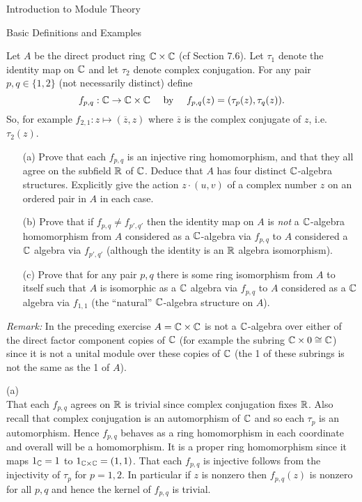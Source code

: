 \begin{chapter}{Introduction to Module Theory}
\begin{section}{Basic Definitions and Examples}
\begin{solution}
\end{solution}\oneperpage



\begin{problem}\label{ex:10.1.23}
Let $A$ be the direct product ring $\mathbb{C}\times \mathbb{C}$ (cf Section 7.6). Let $\tau_1$ denote the identity map on $\mathbb{C}$ and let $\tau_2$ denote complex conjugation. For any pair $p,q\in \{1,2\}$ (not necessarily distinct) define \[
f_{p,q}:\mathbb{C}\to\mathbb{C}\times \mathbb{C}\quad\text{ by }\quad f_{p,q}(z) = (\tau_p(z),\tau_q(z)).
\]
So, for example $f_{2,1}: z\mapsto (\overline{z},z)$ where $\overline{z}$ is the complex conjugate of $z$, i.e. $\tau_2(z)$.\begin{enumerate}
\item[(a)] Prove that each $f_{p,q}$ is an injective ring homomorphism, and that they all agree on the subfield $\mathbb{R}$ of $\mathbb{C}$. Deduce that $A$ has four distinct $\mathbb{C}$-algebra structures. Explicitly give the action $z\cdot(u,v)$ of a complex number $z$ on an ordered pair in $A$ in each case.
\item[(b)] Prove that if $f_{p,q}\neq f_{p',q'}$ then the identity map on $A$ is \emph{not} a $\mathbb{C}$-algebra homomorphism from $A$ considered as a $\mathbb{C}$-algebra via $f_{p,q}$ to $A$ considered a $\mathbb{C}$ algebra via $f_{p',q'}$ (although the identity is an $\mathbb{R}$ algebra isomorphism).
\item[(c)] Prove that for any pair $p,q$ there is some ring isomorphism from $A$ to itself such that $A$ is isomorphic as a $\mathbb{C}$ algebra via $f_{p,q}$ to $A$ considered as a $\mathbb{C}$ algebra via $f_{1,1}$ (the ``natural'' $\mathbb{C}$-algebra structure on $A$).
\end{enumerate}
\emph{Remark:} In the preceding exercise $A=\mathbb{C}\times \mathbb{C}$ is not a $\mathbb{C}$-algebra over either of the direct factor component copies of $\mathbb{C}$ (for example the subring $\mathbb{C}\times 0 \cong \mathbb{C}$) since it is not a unital module over these copies of $\mathbb{C}$ (the 1 of these subrings is not the same as the 1 of $A$).
\end{problem}
\begin{solution}
(a)\\
That each $f_{p,q}$ agrees on $\mathbb{R}$ is trivial since complex conjugation fixes $\mathbb{R}$. Also recall that complex conjugation is an automorphism of $\mathbb{C}$ and so each $\tau_p$ is an automorphism. Hence $f_{p,q}$ behaves as a ring homomorphism in each coordinate and overall will be a homomorphism. It is a proper ring homomorphism since it maps $1_{\mathbb{C}} = 1$ to $1_{\mathbb{C}\times \mathbb{C}} = (1,1)$.
  That each $f_{p,q}$ is injective follows from the injectivity of $\tau_p$ for $p=1,2$. In particular if $z$ is nonzero then $f_{p,q}(z)$ is nonzero for all $p,q$ and hence the kernel of $f_{p,q}$ is trivial.



\end{solution}
\end{section}
\end{chapter}

